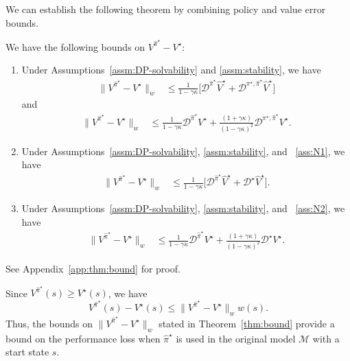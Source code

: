 \documentclass[letterpaper, 10pt]{IEEEtran}
\newcommand*\ALPHABET{\mathcal}
\newcommand*\MISMATCH{\mathscr{D}}
\begin{document}
We can establish the following theorem by combining policy and value error bounds.
\begin{theorem}\label{thm:bound}
   We have the following bounds on $V^{\hat \pi^\star} - V^\star$:
   \begin{enumerate}
   \item Under Assumptions~\ref{assm:DP-solvability} and \ref{assm:stability}, we have
       \begin{align*}
          \bigl\| V^{\hat \pi^\star} - V^\star \bigr\|_w
          &\leq
          \frac{1}{1 - \gamma \kappa }
          \bigl[ \MISMATCH^{\hat \pi^\star} \hat V^\star
          + \MISMATCH^{\pi^\star, \hat \pi^\star} \hat V^\star \bigr]
       \end{align*}
       and
    \begin{align*}
      \bigl\| V^{\hat \pi^\star} - V^\star \bigr\|_w
      &\le
      \frac{1}{1 - \gamma \kappa }
      \MISMATCH^{\hat \pi^\star} V^\star 
      +
      \frac{(1 + \gamma \kappa)}{(1 - \gamma \kappa)^2 }
      \MISMATCH^{\pi^\star, \hat \pi^\star} V^\star. 
   \end{align*}
    \item Under Assumptions~\ref{assm:DP-solvability}, \ref{assm:stability}, and ~\ref{ass:N1}, we have
       \begin{align*}
          \bigl\| V^{\hat \pi^\star} - V^\star \bigr\|_w
          &\leq
          \frac{1}{1 - \gamma \kappa }
          \bigl[ \MISMATCH^{\hat \pi^\star} \hat V^\star
          + \MISMATCH^\star \hat V^\star \bigr].
       \end{align*}
    \item Under Assumptions~\ref{assm:DP-solvability}, \ref{assm:stability}, and ~\ref{ass:N2}, we have
       \begin{align*}
          \bigl\| V^{\hat \pi^\star} - V^\star \bigr\|_w
          &\le
          \frac{1}{1 - \gamma \kappa }
          \MISMATCH^{\hat \pi^\star} V^\star 
          +
          \frac{(1 + \gamma \kappa)}{(1 - \gamma \kappa)^2 }
          \MISMATCH^{\star} V^\star. 
       \end{align*}
   \end{enumerate}
\end{theorem}
See Appendix~\ref{app:thm:bound} for proof.

\begin{remark}
   Since $  V^{\hat \pi^\star}(s) \ge V^{\star}(s)$, we have 
   \begin{equation}\label{eq:V-bound}
    V^{\hat \pi^\star}(s) - V^\star(s) \le \bigl\| V^{\hat \pi^\star} - V^\star \bigr\|_w w(s).
    \end{equation}
    Thus, the bounds on $ \bigl\| V^{\hat \pi^\star} - V^\star \bigr\|_w$ stated in Theorem~\ref{thm:bound} provide a bound on the performance loss when   $\hat \pi^\star$ is used in the original model $\ALPHABET M$ with a start state $s$. 
\end{remark}
\end{document}
